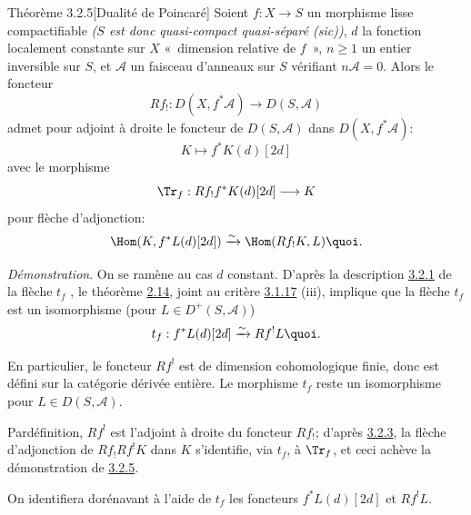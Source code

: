 \begin{enonce*}{Théorème 3.2.5}[Dualité de Poincaré]%
Soient $f:X\rightarrow S$ un morphisme
lisse compactifiable \emph{($S$ est donc quasi-compact
quasi-séparé (sic))}, $d$ la fonction localement constante sur $X$
« dimension relative de $f$ », $n\geq 1$ un entier inversible sur
$S$, et $\mathcal{A}$ un faisceau d'anneaux sur $S$ vérifiant
$n\mathcal{A}=0$. Alors le foncteur
$$
Rf_{!}:D(X,f^{\ast}\mathcal{A})\longrightarrow D(S,\mathcal{A})
$$
admet pour adjoint à droite le foncteur de $D(S,\mathcal{A})$ dans
$D(X,f^{\ast}\mathcal{A})$:
$$
K\longmapsto f^{\ast}K(d)[2d]
$$
avec le morphisme 
$$
\Tr_{f}:Rf_{!}f^{\ast}K(d)[2d]\longrightarrow K
$$
pour flèche d'adjonction:
$$
\Hom(K,f^{\ast}L(d)[2d])\xrightarrow{\sim} \Hom(Rf_{!}K,L){\quoi}.
$$
\end{enonce*}

\noindent
\emph{Démonstration}. On se ramène au cas $d$ constant. D'après la
description \hyperref[XVIII.subsubsec3.2.1]{3.2.1} de la flèche $t_{f}$
, le théorème \hyperref[XVIII.thm2.14]{2.14}, 
joint au critère \hyperref[XVIII.prop3.1.17]{3.1.17} (iii), implique que la flèche $t_{f}$ est un
isomorphisme (pour $L\in D^{+}(S,\mathcal{A})$)
$$
t_{f}:f^{\ast}L(d)[2d]\xrightarrow{\sim} Rf^{!}L{\quoi}.
$$

En particulier, le foncteur $Rf^{!}$ est de dimension cohomologique
finie, donc est défini sur la catégorie dérivée entière. Le morphisme
$t_{f}$ reste un isomorphisme pour $L\in D(S,\mathcal{A})$.

Par\pageoriginale définition, $Rf^{!}$ est l'adjoint à droite du
foncteur $Rf_{!}$; d'après \hyperref[XVIII.lem3.2.3]{3.2.3}, la flèche
d'adjonction de $Rf_{!}Rf^{!}K$ dans $K$ s'identifie,
via $t_{f}$, à $\Tr_{f}$, et ceci
achève la démonstration de \hyperref[XVIII.thm3.2.5]{3.2.5}.

On identifiera dorénavant à l'aide de $t_{f}$ les foncteurs
$f^{\ast}L(d)[2d]$ et $Rf^{!}L$.

